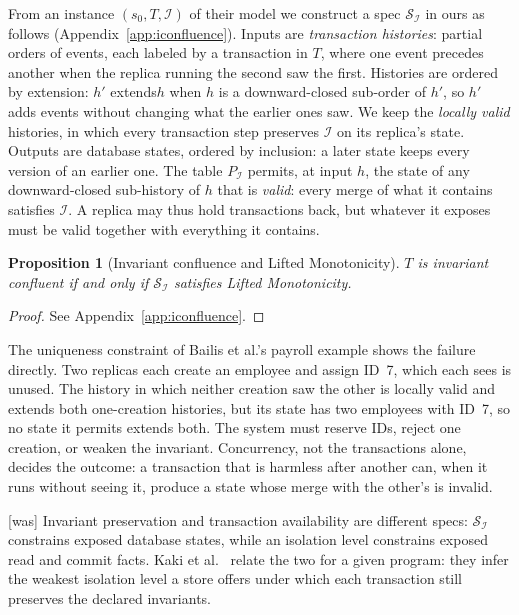 \documentclass[sigconf]{cidr-2027}
\newtheorem{proposition}{Proposition}
\theoremstyle{remark}
\newcommand{\inrel}{extends\xspace}          %
\newcommand{\outrel}{extends\xspace}          %
\newcommand{\Spec}{\mathcal{S}}
\begin{document}
From an instance $(s_0,T,\mathcal I)$ of their model we construct a
spec $\Spec_{\mathcal I}$ in ours as follows (Appendix~\ref{app:iconfluence}).
Inputs are \emph{transaction histories}: partial orders of events, each
labeled by a transaction in $T$, where one event precedes another when the
replica running the second saw the first.  Histories are ordered by extension:
$h'$ \inrel $h$ when $h$ is a downward-closed sub-order of $h'$, so $h'$ adds
events without changing what the earlier ones saw.  We keep the \emph{locally
valid} histories, in which every transaction step preserves $\mathcal I$ on
its replica's state.  Outputs are database states, ordered by inclusion: a
later state keeps every version of an earlier one.  The table $P_{\mathcal I}$ permits, at input $h$, the state of any downward-closed sub-history of $h$
that is \emph{valid}: every merge of what it contains satisfies $\mathcal I$.
A replica may thus hold transactions back, but whatever it exposes must be
valid together with everything it contains.

\begin{proposition}[Invariant confluence and Lifted Monotonicity]
\label{prop:iconfluence-lm}
$T$ is invariant confluent if and only if $\Spec_{\mathcal I}$ satisfies Lifted
Monotonicity.
\end{proposition}

\begin{proof}
See Appendix~\ref{app:iconfluence}.
\end{proof}

The uniqueness constraint of Bailis et al.'s payroll example shows the failure
directly.  Two replicas each create an employee and assign ID~7, which each
sees is unused.  The history in which neither creation saw the other is
locally valid and \inrel both one-creation histories, but its state has two
employees with ID~7, so no state it permits \outrel both.  The system must
reserve IDs, reject one creation, or weaken the invariant.  Concurrency,
not the transactions alone, decides the outcome: a transaction that is harmless
after another can, when it runs without seeing it, produce a state whose merge
with the other's is invalid.



{\footnotesize\color{black!50}\noindent\textsf{[was]} Invariant preservation and transaction availability are different
specs: $\Spec_{\mathcal I}$ constrains exposed database states, while an
isolation level constrains exposed read and commit facts.  Kaki et
al.~\cite{kaki2018alone} relate the two for a given program: they infer the
weakest isolation level a store offers under which each transaction still
preserves the declared invariants.\par}
\end{document}
